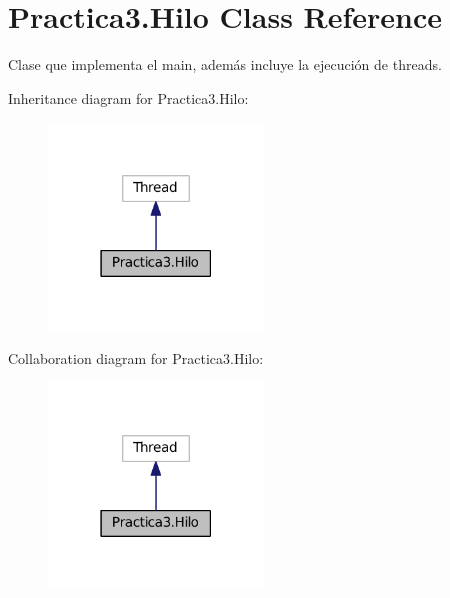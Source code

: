 \hypertarget{class_practica3_1_1_hilo}{}\section{Practica3.\+Hilo Class Reference}
\label{class_practica3_1_1_hilo}


Clase que implementa el main, además incluye la ejecución de threads.  




Inheritance diagram for Practica3.\+Hilo\+:
\nopagebreak
\begin{figure}[H]
\begin{center}
\leavevmode
\includegraphics[width=162pt]{class_practica3_1_1_hilo__inherit__graph}
\end{center}
\end{figure}


Collaboration diagram for Practica3.\+Hilo\+:
\nopagebreak
\begin{figure}[H]
\begin{center}
\leavevmode
\includegraphics[width=162pt]{class_practica3_1_1_hilo__coll__graph}
\end{center}
\end{figure}
